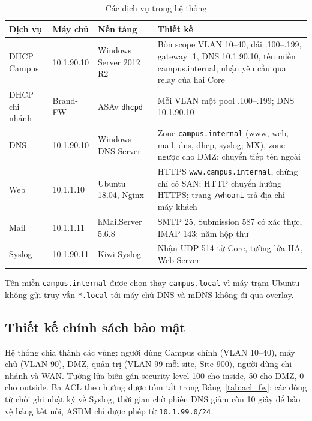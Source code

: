 \begin{table}[H]
    \centering
    \small
    \caption{Các dịch vụ trong hệ thống}
    \label{tab:dich_vu}
    \begin{tabularx}{\textwidth}{|L{2.4cm}|P{1.9cm}|L{2.5cm}|Y|}
        \hline
        \textbf{Dịch vụ} & \textbf{Máy chủ} & \textbf{Nền tảng} & \textbf{Thiết kế} \\
        \hline
        DHCP Campus & 10.1.90.10 & Windows Server 2012 R2 & Bốn scope VLAN 10--40, dải .100--.199, gateway .1, DNS 10.1.90.10, tên miền campus.internal; nhận yêu cầu qua relay của hai Core \\
        \hline
        DHCP chi nhánh & Brand-FW & ASAv \texttt{dhcpd} & Mỗi VLAN một pool .100--.199; DNS 10.1.90.10 \\
        \hline
        DNS & 10.1.90.10 & Windows DNS Server & Zone \texttt{campus.internal} (www, web, mail, dns, dhcp, syslog; MX), zone ngược cho DMZ; chuyển tiếp tên ngoài \\
        \hline
        Web & 10.1.1.10 & Ubuntu 18.04, Nginx & HTTPS \texttt{www.campus.internal}, chứng chỉ có SAN; HTTP chuyển hướng HTTPS; trang \texttt{/whoami} trả địa chỉ máy khách \\
        \hline
        Mail & 10.1.1.11 & hMailServer 5.6.8 & SMTP 25, Submission 587 có xác thực, IMAP 143; năm hộp thư \\
        \hline
        Syslog & 10.1.90.11 & Kiwi Syslog & Nhận UDP 514 từ Core, tường lửa HA, Web Server \\
        \hline
    \end{tabularx}
\end{table}

Tên miền \texttt{campus.internal} được chọn thay \texttt{campus.local} vì máy trạm Ubuntu không gửi truy vấn \texttt{*.local} tới máy chủ DNS và mDNS không đi qua overlay.

\subsection{Thiết kế chính sách bảo mật}

Hệ thống chia thành các vùng: người dùng Campus chính (VLAN 10--40), máy chủ (VLAN 90), DMZ, quản trị (VLAN 99 mỗi site, Site 900), người dùng chi nhánh và WAN. Tường lửa biên gán security-level 100 cho inside, 50 cho DMZ, 0 cho outside. Ba ACL theo hướng được tóm tắt trong Bảng~\ref{tab:acl_fw}; các dòng từ chối ghi nhật ký về Syslog, thời gian chờ phiên DNS giảm còn 10 giây để bảo vệ bảng kết nối, ASDM chỉ được phép từ \texttt{10.1.99.0/24}.

